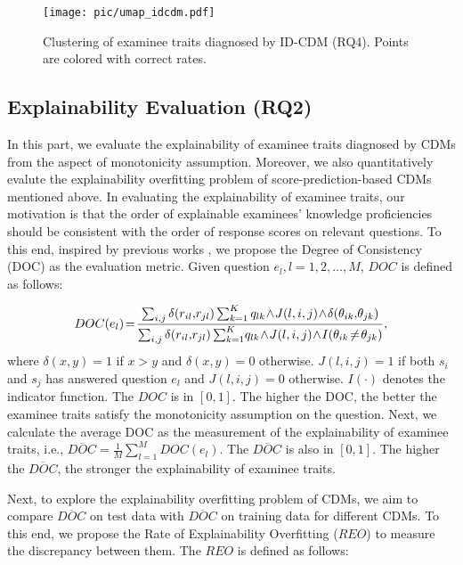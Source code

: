 \documentclass[sigconf]{acmart}
\begin{document}
\begin{figure*}[t]
  \centering
    \texttt{[image: pic/umap\_idcdm.pdf]}
    \vspace{-10pt}
  \caption{Clustering of examinee traits diagnosed by ID-CDM (RQ4). Points are colored with correct rates.}\label{fig:cluster}
  \vspace{-15pt}
\end{figure*}

\vspace{-5pt}
\subsection{Explainability Evaluation (RQ2)}\label{sec:exp-explainability}
\par In this part, we evaluate the explainability of examinee traits diagnosed by CDMs from the aspect of monotonicity assumption. Moreover, we also quantitatively evalute the explainability overfitting problem of score-prediction-based CDMs mentioned above. In evaluating the explainability of examinee traits, our motivation is that the order of explainable examinees' knowledge proficiencies should be consistent with the order of response scores on relevant questions. To this end, inspired by previous works \cite{FoussPRS2007}, we propose the Degree of Consistency (DOC) as the evaluation metric. Given question $e_l, l=1,2,\ldots,M$, $DOC$ is defined as follows:

\vspace{-10pt}
\begin{equation}
DOC(e_l)\!=\!\frac{\sum_{i,j}\delta (r_{il},\! r_{jl})\sum_{k=1}^K q_{lk}\!\land\! J(l,i,j)\!\land\!\delta(\theta_{ik},\!\theta_{jk})}{\sum_{i,j}\delta (r_{il},\! r_{jl})\sum_{k=1}^K\! q_{lk}\!\land\! J(l,i,j)\!\land\! I(\theta_{ik}\!\neq\!\theta_{jk})},
\vspace{-5pt}
\end{equation}
where $\delta(x,y)=1$ if $x>y$ and $\delta(x,y)=0$ otherwise. $J(l,i,j) = 1$ if both $s_i$ and $s_j$ has answered question $e_l$ and $J(l,i,j) = 0$ otherwise. $I(\cdot)$ denotes the indicator function. The $DOC$ is in $[0,1]$. The higher the DOC, the better the examinee traits satisfy the monotonicity assumption on the question. Next, we calculate the average DOC as the measurement of the explainability of examinee traits, i.e., $\overline{DOC} = \frac{1}{M}\sum_{l=1}^{M}DOC(e_l)$. The $\overline{DOC}$ is also in $[0,1]$. The higher the $\overline{DOC}$, the stronger the explainability of examinee traits.
\par Next, to explore the explainability overfitting problem of CDMs, we aim to compare $\overline{DOC}$ on test data with $\overline{DOC}$ on training data for different CDMs. To this end, we propose the Rate of Explainability Overfitting ($REO$) to measure the discrepancy between them. The $REO$ is defined as follows:
\end{document}
